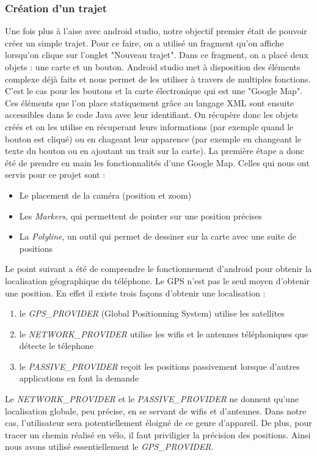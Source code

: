 \documentclass{article}
\begin{document}
\subsubsection{Création d'un trajet}
Une fois plus à l'aise avec android studio, notre objectif premier était de pouvoir créer un simple trajet. Pour ce faire, on a utilisé un
fragment qu'on affiche lorsqu'on clique sur l'onglet "Nouveau trajet". Dans ce fragment, on a placé deux objets : une carte et un bouton.
Android studio met à disposition des éléments complexe déjà faits et nous permet de les utiliser à travers de multiples fonctions. C'est le
cas pour les boutons et la carte électronique qui est une "Google Map". Ces éléments que l'on place statiquement grâce au langage XML sont
ensuite accessibles dans le code Java avec leur identifiant. On récupère donc les objets créés et on les utilise en récuperant leurs informations
(par exemple quand le bouton est cliqué) ou en chageant leur apparence (par exemple en changeant le texte du bouton ou en ajoutant un trait
sur la carte).
La première étape a donc été de prendre en main les fonctionnalités d'une Google Map. Celles qui nous ont servis pour ce projet sont :
\begin{itemize}
  \item Le placement de la caméra (position et zoom)
  \item Les \emph{Markers}, qui permettent de pointer sur une position précises
  \item La \emph{Polyline}, un outil qui permet de dessiner sur la carte avec une suite de positions
\end{itemize}
Le point suivant a été de comprendre le fonctionnement d'android pour obtenir la localisation géographique du téléphone. Le GPS n'est pas le
seul moyen d'obtenir une position. En effet il existe trois façons d'obtenir une localisation :
\begin{enumerate}
  \item le \emph{GPS\_PROVIDER} (Global Positionning System) utilise les satellites
  \item le \emph{NETWORK\_PROVIDER} utilise les wifis et le antennes téléphoniques que détecte le télephone
  \item le \emph{PASSIVE\_PROVIDER} reçoit les positions passivement lorsque d'autres applications en font la demande
\end{enumerate}
Le \emph{NETWORK\_PROVIDER} et le \emph{PASSIVE\_PROVIDER} ne donnent qu'une localisation globale, peu précise, en se servant de wifis
et d'antennes. Dans notre cas, l'utilisateur sera potentiellement éloigné de ce genre d'appareil. De plus, pour tracer un chemin réalisé
en vélo, il faut priviligier la précision des positions. Ainsi nous avons utilisé essentiellement le \emph{GPS\_PROVIDER}.
\end{document}
